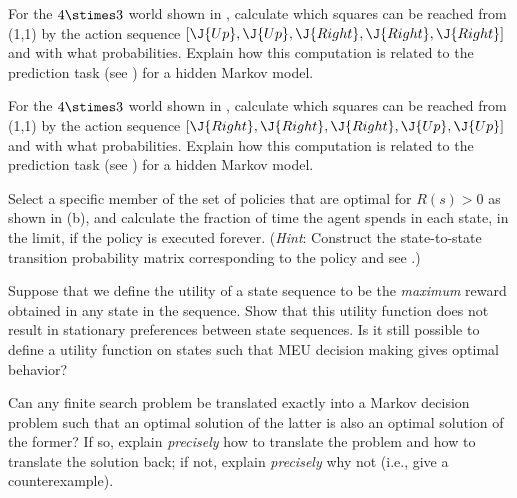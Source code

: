 
\begin{uexercise}%
For the \(4\stimes 3\) world shown in
, calculate which squares  
can be reached from (1,1) by the action sequence \([\J{Up},\J{Up},\J{Right},\J{Right},\J{Right}]\) and with what
probabilities. Explain how this computation is related to the prediction task (see ) for a hidden Markov model. 
\end{uexercise} 

\begin{iexercise}%
For the \(4\stimes 3\) world shown in
, calculate which squares  
can be reached from (1,1) by the action sequence \([\J{Right},\J{Right},\J{Right},\J{Up},\J{Up}]\) and with what
probabilities. Explain how this computation is related to the prediction task (see ) for a hidden Markov model. 
\end{iexercise} 

\begin{uexercise}
Select a specific member of the set of policies that are optimal for
\(R(s)>0\) as shown in (b),
and calculate the fraction of time the agent spends in each state, in the limit,
if the policy is executed forever. ({\em Hint}: Construct the state-to-state
transition probability matrix corresponding to the policy and see
.)
\end{uexercise} 

\begin{exercise}%
Suppose that we define the utility of a state sequence to be the {\em
maximum} reward obtained in any state in the sequence.  Show that this
utility function does not result in stationary preferences between
state sequences.  Is it still possible to define a utility function on
states such that MEU decision making gives optimal behavior?
\end{exercise} 

\begin{iexercise}
Can any finite search problem be translated exactly into a Markov
decision problem such that an optimal solution of the latter is also
an optimal solution of the former? If so, explain {\em precisely} how
to translate the problem and how to translate the solution back; if
not, explain {\em precisely} why not (i.e., give a counterexample).
\end{iexercise} 

